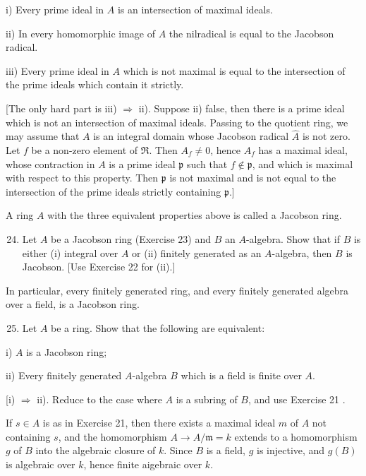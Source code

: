 \documentclass{standalone}
\theoremstyle{definition}
\theoremstyle{remark}
\begin{document}
i) Every prime ideal in $A$ is an intersection of maximal ideals.

ii) In every homomorphic image of $A$ the nilradical is equal to the Jacobson radical.

iii) Every prime ideal in $A$ which is not maximal is equal to the intersection of the prime ideals which contain it strictly.

[The only hard part is iii) $\Rightarrow$ ii). Suppose ii) false, then there is a prime ideal which is not an intersection of maximal ideals. Passing to the quotient ring, we may assume that $A$ is an integral domain whose Jacobson radical $\hat{A}$ is not zero. Let $f$ be a non-zero element of $\Re$. Then $A_{f} \neq 0$, hence $A_{f}$ has a maximal ideal, whose contraction in $A$ is a prime ideal $\mathfrak{p}$ such that $f \notin \mathfrak{p}$, and which is maximal with respect to this property. Then $\mathfrak{p}$ is not maximal and is not equal to the intersection of the prime ideals strictly containing $\mathfrak{p}$.]

A ring $A$ with the three equivalent properties above is called a Jacobson ring.

\begin{enumerate}
  \setcounter{enumi}{23}
  \item Let $A$ be a Jacobson ring (Exercise 23) and $B$ an $A$-algebra. Show that if $B$ is either (i) integral over $A$ or (ii) finitely generated as an $A$-algebra, then $B$ is Jacobson. [Use Exercise 22 for (ii).]
\end{enumerate}

In particular, every finitely generated ring, and every finitely generated algebra over a field, is a Jacobson ring.

\begin{enumerate}
  \setcounter{enumi}{24}
  \item Let $A$ be a ring. Show that the following are equivalent:
\end{enumerate}

i) $A$ is a Jacobson ring;

ii) Every finitely generated $A$-algebra $B$ which is a field is finite over $A$.

[i) $\Rightarrow$ ii). Reduce to the case where $A$ is a subring of $B$, and use Exercise 21 .

If $s \in A$ is as in Exercise 21, then there exists a maximal ideal $m$ of $A$ not containing $s$, and the homomorphism $A \rightarrow A / \mathfrak{m}=k$ extends to a homomorphism $g$ of $B$ into the algebraic closure of $k$. Since $B$ is a field, $g$ is injective, and $g(B)$ is algebraic over $k$, hence finite aigebraic over $k$.
\end{document}
